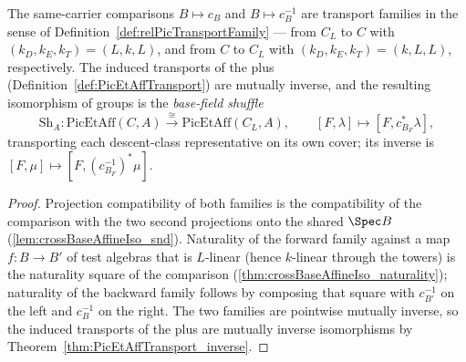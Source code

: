 \begin{definition}
  \label{def:PicEtAff_baseFieldShuffle}
  \leanok
  The same-carrier comparisons \(B \mapsto c_B\) and \(B \mapsto c_B^{-1}\) are transport
  families in the sense of Definition~\ref{def:relPicTransportFamily} — from \(C_L\) to
  \(C\) with \((k_D, k_E, k_T) = (L, k, L)\), and from \(C\) to \(C_L\) with
  \((k_D, k_E, k_T) = (k, L, L)\), respectively. The induced transports of the plus
  (Definition~\ref{def:PicEtAffTransport}) are mutually inverse, and the resulting
  isomorphism of groups is the \emph{base-field shuffle}
  \[
    \mathrm{Sh}_A \colon \mathrm{PicEtAff}(C, A) \xrightarrow{\ \cong\ }
      \mathrm{PicEtAff}(C_L, A),
    \qquad [F, \lambda] \longmapsto [F, c_{B_F}^{*}\lambda],
  \]
  transporting each descent-class representative on its own cover; its inverse is
  \([F, \mu] \mapsto [F, (c_{B_F}^{-1})^{*}\mu]\).
\end{definition}
\begin{proof}
  \leanok
  Projection compatibility of both families is the compatibility of the comparison with
  the two second projections onto the shared \(\Spec B\)
  (\ref{lem:crossBaseAffineIso_snd}). Naturality of the forward family against a map
  \(f \colon B \to B'\) of test algebras that is \(L\)-linear (hence \(k\)-linear through
  the towers) is the naturality square of the comparison
  (\ref{thm:crossBaseAffineIso_naturality}); naturality of the backward family follows by
  composing that square with \(c_{B'}^{-1}\) on the left and \(c_B^{-1}\) on the right.
  The two families are pointwise mutually inverse, so the induced transports of the plus
  are mutually inverse isomorphisms by Theorem~\ref{thm:PicEtAffTransport_inverse}.
\end{proof}

